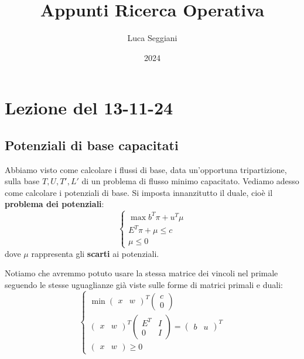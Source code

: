 \documentclass[a4paper,11pt]{article}
\title{Appunti Ricerca Operativa}
\author{Luca Seggiani}
\date{2024}
\begin{document}
\section{Lezione del 13-11-24}

\thispagestyle{empty}
\pagestyle{fancy}

\subsection{Potenziali di base capacitati}
Abbiamo visto come calcolare i flussi di base, data un'opportuna tripartizione, sulla base $T, U, T', L'$ di un problema di flusso minimo capacitato.
Vediamo adesso come calcolare i potenziali di base.
Si imposta innanzitutto il duale, cioè il \textbf{problema dei potenziali}: 
\[
	\begin{cases}
		\max b^T \pi + u^T \mu \\ 
		E^T \pi + \mu \leq c \\ 
		\mu \leq 0
	\end{cases}
\]
dove $\mu$ rappresenta gli \textbf{scarti} ai potenziali. 

Notiamo che avremmo potuto usare la stessa matrice dei vincoli nel primale seguendo le stesse uguaglianze già viste sulle forme di matrici primali e duali:
\[
	\begin{cases}
		\min
		\begin{pmatrix}
			x & w
		\end{pmatrix}^T
		\begin{pmatrix}
			c \\ 0
		\end{pmatrix} \\ 
		\begin{pmatrix}
			x & w
		\end{pmatrix}^T
		\begin{pmatrix}
			E^T & I \\ 
			0 & I 
		\end{pmatrix}
		=
		\begin{pmatrix}
			b & u
		\end{pmatrix}^T \\ 
		\begin{pmatrix}
			x & w
		\end{pmatrix}
		\geq 0
	\end{cases}
\]
\end{document}
